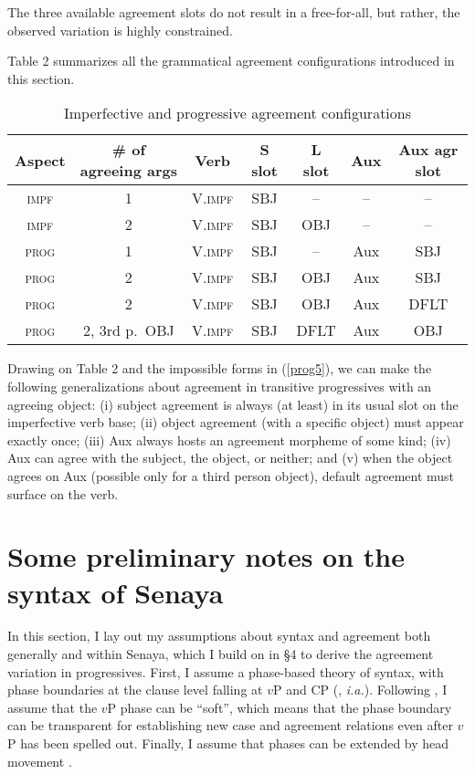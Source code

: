 \documentclass[output=paper
,modfonts
,nonflat]{langsci/langscibook}
\begin{document}
\noindent The three available agreement slots do not result in a free-for-all, but rather, the observed variation is highly constrained.

Table 2 summarizes all the grammatical agreement configurations introduced in this section.

\begin{table}
\caption{Imperfective and progressive agreement configurations}

\begin{tabular}[t]{|cc||ccccc|}
\hline Aspect & \# of agreeing args & Verb & S slot & L slot & Aux & Aux agr slot \\
\hline \hline  \textsc{impf} & 1 & V.\textsc{impf} & SBJ & -- & -- & -- \\
\hline  \textsc{impf} & 2 & V.\textsc{impf}& SBJ & OBJ & -- & -- \\
\hline   \textsc{prog} & 1 & V.\textsc{impf}& SBJ & -- & Aux & SBJ \\
\hline \textsc{prog}  & 2  & V.\textsc{impf}& SBJ & OBJ & Aux & SBJ\\
\hline  \textsc{prog} & 2 & V.\textsc{impf}& SBJ & OBJ & Aux & DFLT \\
\hline  \textsc{prog} & 2, 3rd p.\ OBJ & V.\textsc{impf}& SBJ & DFLT & Aux& OBJ \\
\hline \end{tabular}

\end{table}

\noindent Drawing on Table 2 and the impossible forms in (\ref{prog5}), we can make the following generalizations about agreement in transitive progressives with an agreeing object: (i) subject agreement is always (at least) in its usual slot on the imperfective verb base; (ii) object agreement (with a specific object) must appear exactly once; (iii) Aux always hosts an agreement morpheme of some kind; (iv) Aux can agree with the subject, the object, or neither; and (v) when the object agrees on Aux (possible only for a third person object), default agreement must surface on the verb.

\section{Some preliminary notes on the syntax of Senaya}

In this section, I lay out my assumptions about syntax and agreement both generally and within Senaya, which I build on in \S4 to derive the agreement variation in progressives. First, I assume a phase-based theory of syntax, with phase boundaries at the clause level falling at $v$P and CP (\citealt{Chomsky01}, \textit{i.a.}). Following \citet{Baker15}, I assume that the $v$P phase can be ``soft'', which means that the phase boundary can be transparent for establishing new case and agreement relations even after $v$P has been spelled out. Finally, I assume that phases can be extended by head movement \citep{denDikken06,denDikken07,Gallego10}.
\end{document}
